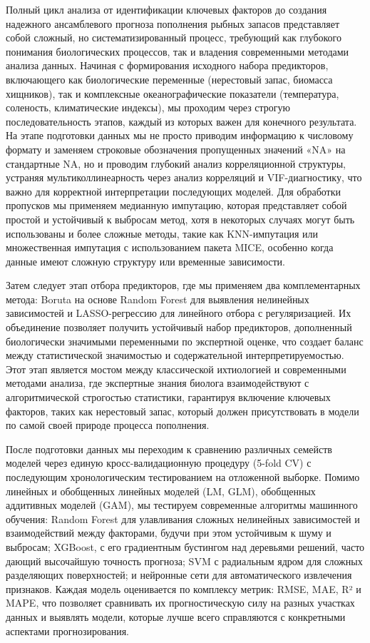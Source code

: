 \documentclass[
  letterpaper,
  DIV=11,
  numbers=noendperiod]{scrreprt}
\begin{document}
Полный цикл анализа от идентификации ключевых факторов до создания
надежного ансамблевого прогноза пополнения рыбных запасов представляет
собой сложный, но систематизированный процесс, требующий как глубокого
понимания биологических процессов, так и владения современными методами
анализа данных. Начиная с формирования исходного набора предикторов,
включающего как биологические переменные (нерестовый запас, биомасса
хищников), так и комплексные океанографические показатели (температура,
соленость, климатические индексы), мы проходим через строгую
последовательность этапов, каждый из которых важен для конечного
результата. На этапе подготовки данных мы не просто приводим информацию
к числовому формату и заменяем строковые обозначения пропущенных
значений «NA» на стандартные NA, но и проводим глубокий анализ
корреляционной структуры, устраняя мультиколлинеарность через анализ
корреляций и VIF-диагностику, что важно для корректной интерпретации
последующих моделей. Для обработки пропусков мы применяем медианную
импутацию, которая представляет собой простой и устойчивый к выбросам
метод, хотя в некоторых случаях могут быть использованы и более сложные
методы, такие как KNN-импутация или множественная импутация с
использованием пакета MICE, особенно когда данные имеют сложную
структуру или временные зависимости.

Затем следует этап отбора предикторов, где мы применяем два
комплементарных метода: Boruta на основе Random Forest для выявления
нелинейных зависимостей и LASSO-регрессию для линейного отбора с
регуляризацией. Их объединение позволяет получить устойчивый набор
предикторов, дополненный биологически значимыми переменными по
экспертной оценке, что создает баланс между статистической значимостью и
содержательной интерпретируемостью. Этот этап является мостом между
классической ихтиологией и современными методами анализа, где экспертные
знания биолога взаимодействуют с алгоритмической строгостью статистики,
гарантируя включение ключевых факторов, таких как нерестовый запас,
который должен присутствовать в модели по самой своей природе процесса
пополнения.

После подготовки данных мы переходим к сравнению различных семейств
моделей через единую кросс-валидационную процедуру (5-fold CV) с
последующим хронологическим тестированием на отложенной выборке. Помимо
линейных и обобщенных линейных моделей (LM, GLM), обобщенных аддитивных
моделей (GAM), мы тестируем современные алгоритмы машинного обучения:
Random Forest для улавливания сложных нелинейных зависимостей и
взаимодействий между факторами, будучи при этом устойчивым к шуму и
выбросам; XGBoost, с его градиентным бустингом над деревьями решений,
часто дающий высочайшую точность прогноза; SVM с радиальным ядром для
сложных разделяющих поверхностей; и нейронные сети для автоматического
извлечения признаков. Каждая модель оценивается по комплексу метрик:
RMSE, MAE, R² и MAPE, что позволяет сравнивать их прогностическую силу
на разных участках данных и выявлять модели, которые лучше всего
справляются с конкретными аспектами прогнозирования.
\end{document}

